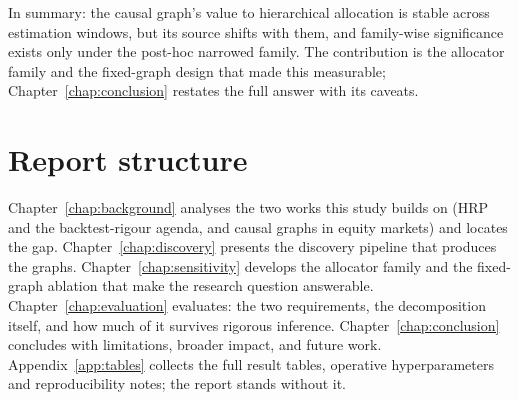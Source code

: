 In summary: the causal graph's value to hierarchical allocation
is stable across estimation windows, but its source shifts with them,
and family-wise significance exists only under the post-hoc narrowed
family. The contribution is the allocator family
and the fixed-graph design that made this measurable;
Chapter~\ref{chap:conclusion} restates the full answer with its caveats.

\section{Report structure}
\label{sec:structure}

Chapter~\ref{chap:background} analyses the two works this study builds
on (HRP and the backtest-rigour agenda, and causal graphs in equity
markets) and locates the gap. Chapter~\ref{chap:discovery} presents the
discovery pipeline that produces the graphs. Chapter~\ref{chap:sensitivity}
develops the allocator family and the fixed-graph ablation that make the
research question
answerable. Chapter~\ref{chap:evaluation} evaluates: the two
requirements, the decomposition itself, and how much of it survives rigorous
inference. Chapter~\ref{chap:conclusion} concludes with limitations,
broader impact, and future work. Appendix~\ref{app:tables} collects the full
result tables,
operative hyperparameters and reproducibility notes; the report stands
without it.
